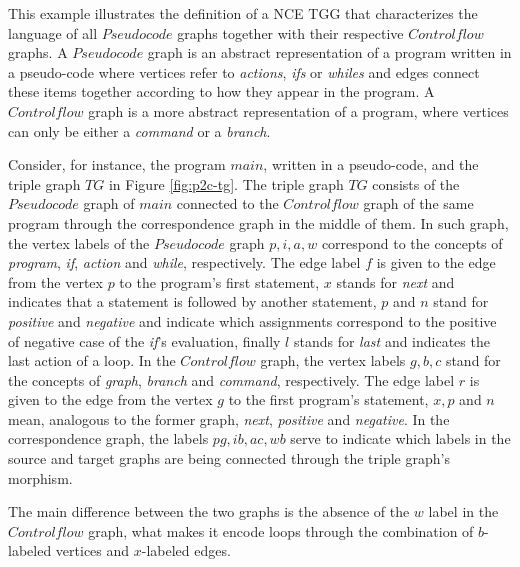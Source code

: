 \documentclass[runningheads]{llncs}
\begin{document}
\begin{example}
	\label{ex:pseudocode2controlflow}
	This example illustrates the definition of a NCE TGG that characterizes the language of all $Pseudocode$ graphs together with their respective $Controlflow$ graphs. A $Pseudocode$ graph is an abstract representation of a program written in a pseudo-code where vertices refer to \textit{actions}, \textit{ifs} or \textit{whiles} and edges connect these items together according to how they appear in the program. A $Controlflow$ graph is a more abstract representation of a program, where vertices can only be either a \textit{command} or a \textit{branch}.
	
	Consider, for instance, the program $main$, written in a pseudo-code, and the triple graph $TG$ in Figure \ref{fig:p2c-tg}. The triple graph $TG$ consists of the $Pseudocode$ graph of $main$ connected to the $Controlflow$ graph of the same program through the correspondence graph in the middle of them. In such graph, the vertex labels of the $Pseudocode$ graph $p, i, a, w$ correspond to the concepts of \textit{program}, \textit{if}, \textit{action} and \textit{while}, respectively. The edge label $f$ is given to the edge from the vertex $p$ to the program's first statement, $x$ stands for \textit{next} and indicates that a statement is followed by another statement, $p$ and $n$ stand for \textit{positive} and \textit{negative} and indicate which assignments correspond to the positive of negative case of the \textit{if}'s evaluation, finally $l$ stands for \textit{last} and indicates the last action of a loop. In the $Controlflow$ graph, the vertex labels $g, b, c$ stand for the concepts of \textit{graph}, \textit{branch} and \textit{command}, respectively. The edge label $r$ is given to the edge from the vertex $g$ to the first program's statement, $x, p$ and $n$ mean, analogous to the former graph, \textit{next}, \textit{positive} and \textit{negative}. In the correspondence graph, the labels $pg, ib, ac, wb$ serve to indicate which labels in the source and target graphs are being connected through the triple graph's morphism.
	
	The main difference between the two graphs is the absence of the $w$ label in the $Controlflow$ graph, what makes it encode loops through the combination of $b$-labeled vertices and $x$-labeled edges.
	

\end{example}
\end{document}
